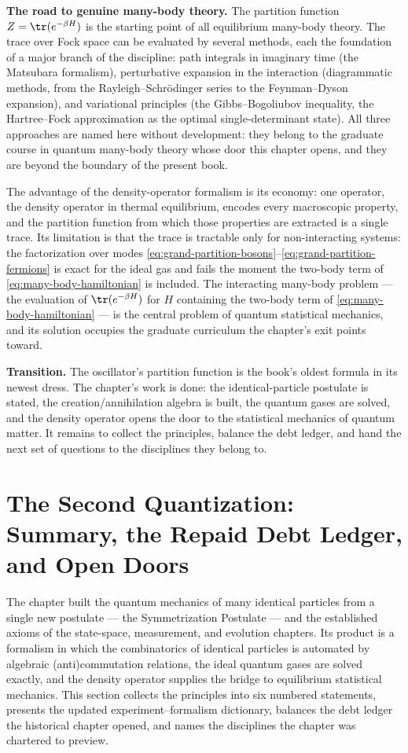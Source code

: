 \medskip\noindent\textbf{The road to genuine many-body theory.}
The partition function $Z = \tr(e^{-\beta H})$ is the starting point of all equilibrium many-body theory. The trace over Fock space can be evaluated by several methods, each the foundation of a major branch of the discipline: path integrals in imaginary time (the Matsubara formalism), perturbative expansion in the interaction (diagrammatic methods, from the Rayleigh--Schr\"odinger series to the Feynman--Dyson expansion), and variational principles (the Gibbs--Bogoliubov inequality, the Hartree--Fock approximation as the optimal single-determinant state). All three approaches are named here without development: they belong to the graduate course in quantum many-body theory whose door this chapter opens, and they are beyond the boundary of the present book.

The advantage of the density-operator formalism is its economy: one operator, the density operator in thermal equilibrium, encodes every macroscopic property, and the partition function from which those properties are extracted is a single trace. Its limitation is that the trace is tractable only for non-interacting systems: the factorization over modes \eqref{eq:grand-partition-bosons}--\eqref{eq:grand-partition-fermions} is exact for the ideal gas and fails the moment the two-body term of \eqref{eq:many-body-hamiltonian} is included. The interacting many-body problem --- the evaluation of $\tr(e^{-\beta H})$ for $H$ containing the two-body term of \eqref{eq:many-body-hamiltonian} --- is the central problem of quantum statistical mechanics, and its solution occupies the graduate curriculum the chapter's exit points toward.

\medskip\noindent\textbf{Transition.}
The oscillator's partition function is the book's oldest formula in its newest dress. The chapter's work is done: the identical-particle postulate is stated, the creation/annihilation algebra is built, the quantum gases are solved, and the density operator opens the door to the statistical mechanics of quantum matter. It remains to collect the principles, balance the debt ledger, and hand the next set of questions to the disciplines they belong to.

\section{The Second Quantization: Summary, the Repaid Debt Ledger, and Open Doors}
\label{sec:ch10summary}

The chapter built the quantum mechanics of many identical particles from a single new postulate --- the Symmetrization Postulate --- and the established axioms of the state-space, measurement, and evolution chapters. Its product is a formalism in which the combinatorics of identical particles is automated by algebraic (anti)commutation relations, the ideal quantum gases are solved exactly, and the density operator supplies the bridge to equilibrium statistical mechanics. This section collects the principles into six numbered statements, presents the updated experiment--formalism dictionary, balances the debt ledger the historical chapter opened, and names the disciplines the chapter was chartered to preview.

